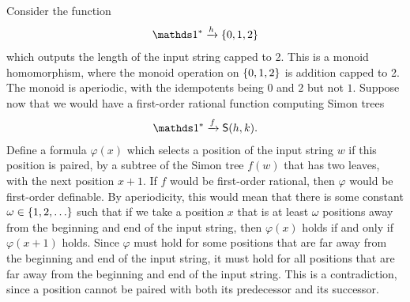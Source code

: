 { Consider the function
\begin{align*}
 \onetype^* \xrightarrow h \set{0,1,2}
\end{align*}
which outputs the length of the input string capped to 2. This is a monoid homomorphism, where the monoid operation on $\{0,1,2\}$ is addition capped to 2. The monoid is aperiodic, with the idempotents being $0$ and $2$ but not $1$. Suppose now that we would have a first-order rational function computing Simon trees 
\begin{align*}
\onetype^* \xrightarrow f \facttype {h, k}.
\end{align*}
Define a formula $\varphi(x)$ which selects a position of the input string $w$ if this position is paired, by a subtree of the Simon tree $f(w)$ that has two leaves, with the next position $x+1$. If $f$ would be first-order rational, then  $\varphi$ would be first-order definable. By aperiodicity, this would mean that there is some constant $\omega \in \{1,2,\ldots\}$ such that if we take a position $x$ that is at least $\omega$ positions away from the beginning and end of the input string, then $\varphi(x)$ holds if and only if $\varphi(x+1)$ holds. Since $\varphi$ must hold for some positions that are far away from the beginning and end of the input string, it must hold for all positions that are far away from the beginning and end of the input string. This is a contradiction, since a position cannot be paired with both its predecessor and its successor.
}


